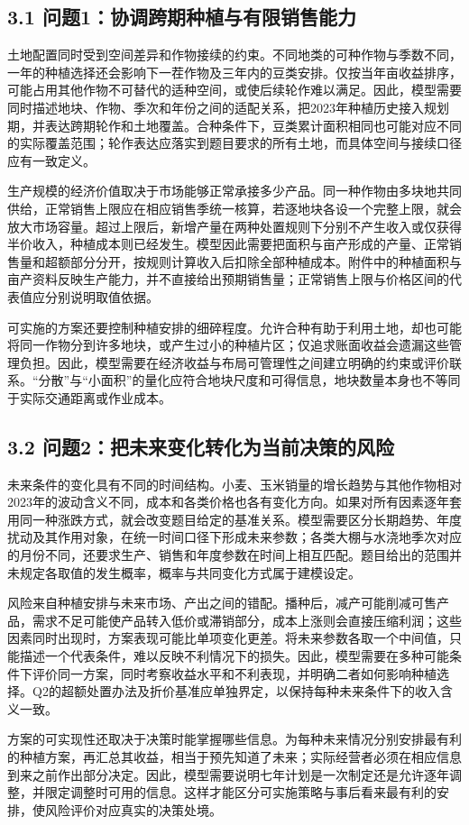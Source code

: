 \documentclass[11pt,a4paper]{article}
\begin{document}
\subsection*{3.1 问题1：协调跨期种植与有限销售能力}
土地配置同时受到空间差异和作物接续的约束。不同地类的可种作物与季数不同，一年的种植选择还会影响下一茬作物及三年内的豆类安排。仅按当年亩收益排序，可能占用其他作物不可替代的适种空间，或使后续轮作难以满足。因此，模型需要同时描述地块、作物、季次和年份之间的适配关系，把2023年种植历史接入规划期，并表达跨期轮作和土地覆盖。合种条件下，豆类累计面积相同也可能对应不同的实际覆盖范围；轮作表达应落实到题目要求的所有土地，而具体空间与接续口径应有一致定义。\par
生产规模的经济价值取决于市场能够正常承接多少产品。同一种作物由多块地共同供给，正常销售上限应在相应销售季统一核算，若逐地块各设一个完整上限，就会放大市场容量。超过上限后，新增产量在两种处置规则下分别不产生收入或仅获得半价收入，种植成本则已经发生。模型因此需要把面积与亩产形成的产量、正常销售量和超额部分分开，按规则计算收入后扣除全部种植成本。附件中的种植面积与亩产资料反映生产能力，并不直接给出预期销售量；正常销售上限与价格区间的代表值应分别说明取值依据。\par
可实施的方案还要控制种植安排的细碎程度。允许合种有助于利用土地，却也可能将同一作物分到许多地块，或产生过小的种植片区；仅追求账面收益会遗漏这些管理负担。因此，模型需要在经济收益与布局可管理性之间建立明确的约束或评价联系。“分散”与“小面积”的量化应符合地块尺度和可得信息，地块数量本身也不等同于实际交通距离或作业成本。\par
\subsection*{3.2 问题2：把未来变化转化为当前决策的风险}
未来条件的变化具有不同的时间结构。小麦、玉米销量的增长趋势与其他作物相对2023年的波动含义不同，成本和各类价格也各有变化方向。如果对所有因素逐年套用同一种涨跌方式，就会改变题目给定的基准关系。模型需要区分长期趋势、年度扰动及其作用对象，在统一时间口径下形成未来参数；各类大棚与水浇地季次对应的月份不同，还要求生产、销售和年度参数在时间上相互匹配。题目给出的范围并未规定各取值的发生概率，概率与共同变化方式属于建模设定。\par
风险来自种植安排与未来市场、产出之间的错配。播种后，减产可能削减可售产品，需求不足可能使产品转入低价或滞销部分，成本上涨则会直接压缩利润；这些因素同时出现时，方案表现可能比单项变化更差。将未来参数各取一个中间值，只能描述一个代表条件，难以反映不利情况下的损失。因此，模型需要在多种可能条件下评价同一方案，同时考察收益水平和不利表现，并明确二者如何影响种植选择。Q2的超额处置办法及折价基准应单独界定，以保持每种未来条件下的收入含义一致。\par
方案的可实现性还取决于决策时能掌握哪些信息。为每种未来情况分别安排最有利的种植方案，再汇总其收益，相当于预先知道了未来；实际经营者必须在相应信息到来之前作出部分决定。因此，模型需要说明七年计划是一次制定还是允许逐年调整，并限定调整时可用的信息。这样才能区分可实施策略与事后看来最有利的安排，使风险评价对应真实的决策处境。\par
\end{document}
